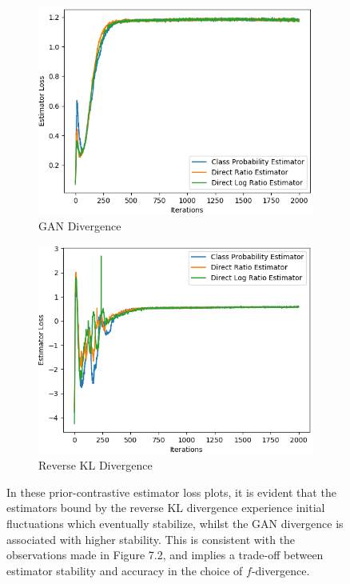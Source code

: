 \documentclass[honours,12pt, twoside]{unswthesis}
\numberwithin{equation}{section}
\theoremstyle{definition}
\begin{document}
\newpage
\begin{figure}[h]
\begin{subfigure}{0.49\textwidth}
\includegraphics[width=\linewidth]{part2estimatorlosses/PCADVvsPCADVexpvsPCADVgudlog.png}
\caption{GAN Divergence}
\end{subfigure}
\begin{subfigure}{0.49\textwidth}
\includegraphics[width=\linewidth]{part2estimatorlosses/PCKLDvsPCKLexpvsPCKLgudlog.png}
\caption{Reverse KL Divergence}
\end{subfigure}
\caption{\small In these prior-contrastive estimator loss plots, it is evident that the estimators bound by the reverse KL divergence experience initial fluctuations which eventually stabilize, whilst the GAN divergence is associated with higher stability. This is consistent with the observations made in Figure 7.2, and implies a trade-off between estimator stability and accuracy in the choice of $f$-divergence.}
\end{figure}
\end{document}
